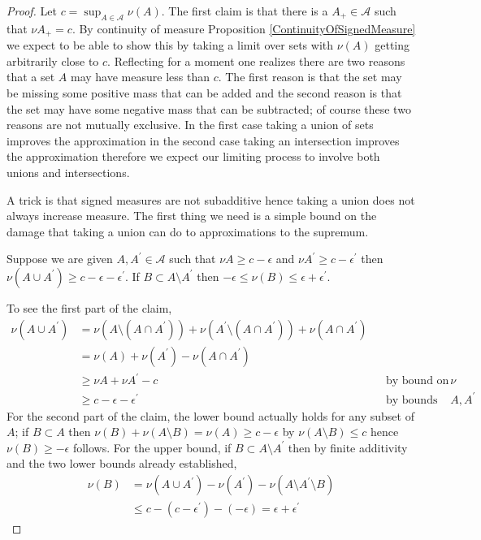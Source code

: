 \begin{proof}Let $c=\sup_{A \in \mathcal{A}} \nu(A)$.  The first claim
  is that there is a $A_+ \in \mathcal{A}$ such that $\nu A_+ = c$.
By continuity of measure Proposition \ref{ContinuityOfSignedMeasure} we expect to
be able to show this by taking a limit over sets with $\nu(A)$ getting arbitrarily close to $c$.  
Reflecting for a moment one realizes there are two reasons that a set $A$ may have measure less than 
$c$.  The first reason is that the set may be missing some positive mass that can be added and the second
reason is that the set may have some negative mass that can be subtracted; of course these two reasons are not 
mutually exclusive.  In the first case taking a union of sets improves the approximation in the second case taking an 
intersection improves the approximation therefore we expect our limiting process to involve both unions and intersections.

A trick is that signed measures are not subadditive hence taking a union does not always increase measure. 
The first thing we need is a simple bound on the damage that
taking a union can do to approximations to the supremum.
\begin{clm}Suppose we  are given $A,A^\prime \in \mathcal{A}$ such that $\nu A \geq c -
  \epsilon$ and $\nu A^\prime \geq c - \epsilon^\prime$ then $\nu(A \cup A^\prime) \geq c - \epsilon - \epsilon^\prime$.
 If $B \subset A \setminus A^\prime$ then $-\epsilon \leq \nu(B) \leq \epsilon + \epsilon^\prime$.
\end{clm}
To see the first part of the claim,
\begin{align*}
\nu (A \cup A^\prime) &= \nu (A \setminus (A \cap A^\prime)) + \nu (A^\prime  \setminus (A \cap A^\prime)) + \nu (A \cap A^\prime) \\
&=\nu (A) + \nu (A^\prime) - \nu (A \cap A^\prime) \\
&\geq \nu A + \nu A^\prime - c & &\text{by bound on $\nu$} \\
&\geq c - \epsilon - \epsilon^\prime & &\text{by bounds on $A,A^\prime$}
\end{align*}
For the second part of the claim, the lower bound actually holds for any subset of $A$; if $B \subset A$ then
$\nu(B) + \nu(A\setminus B) = \nu(A) \geq c - \epsilon$ by $\nu(A \setminus B) \leq c$ hence
$\nu(B) \geq -\epsilon$ follows.  For the upper bound, if $B \subset A \setminus A^\prime$ then by finite additivity
and the two lower bounds already established,
\begin{align*}
\nu(B) &= \nu(A \cup A^\prime) - \nu(A^\prime) - \nu(A \setminus A^\prime \setminus B) \\
&\leq c - (c - \epsilon^\prime) - (-\epsilon) = \epsilon + \epsilon^\prime
\end{align*}


\end{proof}
